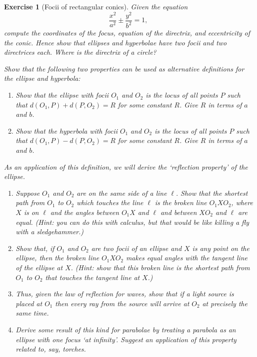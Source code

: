 \documentclass[a4paper,leqno,10pt]{article}
\theoremstyle{exercise}
\newtheorem{Exercise}{Exercise}
\newenvironment{exercise}
  {\begin{mdframed}\begin{Exercise}}
  {\end{Exercise}\end{mdframed}}
\theoremstyle{plain}
\theoremstyle{definition}
\theoremstyle{remark}
\begin{document}
\begin{exercise}[Focii of rectangular conics]
  Given the equation
  \begin{displaymath}
    \frac{x^2}{a^2} \pm \frac{y^2}{b^2} = 1,
  \end{displaymath}
  compute the coordinates of the focus, equation of the directrix, and eccentricity of the conic. Hence show that
  ellipses and hyperbolae have two focii and two directrices each. Where is the directrix of a circle?

  Show that the following two properties can be used as alternative definitions for the ellipse and hyperbola:
  \begin{enumerate}[label={AP\arabic*}.]
    \item Show that the ellipse with focii $ O_1 $ and $ O_2 $ is the locus of all points $ P $
          such that $ d(O_1, P) + d(P, O_2) = R $ for some constant $ R $. Give $ R $ in terms of $ a $ and $ b $.
    \item Show that the hyperbola with focii $ O_1 $ and $ O_2 $ is the locus of all points $ P $
          such that $ d(O_1, P) - d(P, O_2) = R $ for some constant $ R $. Give $ R $ in terms of $ a $ and $ b $.
  \end{enumerate}

  As an application of this definition, we will derive the `reflection property' of the ellipse.
  \begin{enumerate}
    \item Suppose $ O_1 $ and $ O_2 $ are on the same side of a line $ \ell $. Show that the shortest path from $ O_1 $
          to $ O_2 $ which touches the line $ \ell $ is the broken line $ O_1XO_2 $, where $ X $ is on $ \ell $ and
          the angles between $ O_1 X $ and $ \ell $ and between $ X O_2 $ and $ \ell $ are equal. (Hint: you can do this
          with calculus, but that would be like killing a fly with a sledgehammer.)
    \item Show that, if $ O_1 $ and $ O_2 $ are two focii of an ellipse and $ X $ is any point on the ellipse, then the broken line $ O_1 X O_2 $
          makes equal angles with the tangent line of the ellipse at $ X $. (Hint: show that this broken line is the shortest path from $ O_1 $ to $ O_2 $
          that touches the tangent line at $ X $.)
    \item Thus, given the law of reflection for waves, show that if a light source is placed at $ O_1 $ then every ray from the source
          will arrive at $ O_2 $ at precisely the same time.
    \item Derive some result of this kind for parabolae by treating a parabola as an ellipse with one focus `at infinity'. Suggest an
          application of this property related to, say, torches.
  \end{enumerate}
\end{exercise}
\end{document}

